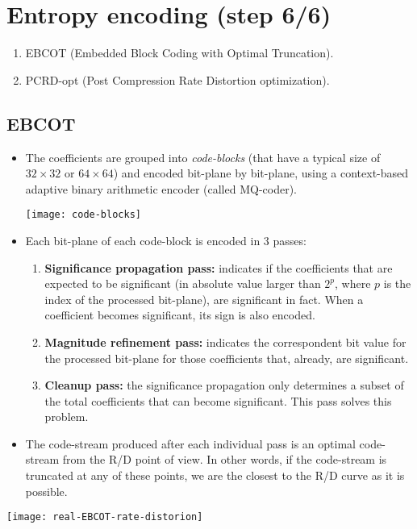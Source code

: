 \section{Entropy encoding (step 6/6)}
\label{J2K-codificacion-entropica}
\begin{enumerate}
\item EBCOT (Embedded Block Coding with Optimal Truncation).
\item PCRD-opt (Post Compression Rate Distortion optimization).
\end{enumerate}

\newpage
\subsection*{EBCOT~\cite{2002.taubman}}
\begin{itemize}
\item The coefficients are grouped into \textit{code-blocks} (that
  have a typical size of $32\times 32$ or $64\times 64$) and encoded
  bit-plane by bit-plane, using a context-based adaptive binary
  arithmetic encoder (called MQ-coder).
  \begin{center}
    \texttt{[image: code-blocks]}
  \end{center}
\newpage
\item Each bit-plane of each code-block is encoded in 3 passes:
\begin{enumerate}
\item \textbf{Significance propagation pass:} indicates if the
  coefficients that are expected to be significant (in absolute value
  larger than $2^p$, where $p$ is the index of the processed
  bit-plane), are significant in fact. When a coefficient becomes
  significant, its sign is also encoded.
\item \textbf{Magnitude refinement pass:} indicates the correspondent
  bit value for the processed bit-plane for those coefficients that,
  already, are significant.
\item \textbf{Cleanup pass:} the significance propagation only
  determines a subset of the total coefficients that can become
  significant. This pass solves this problem.
\end{enumerate}

\newpage
\item The code-stream produced after each individual pass is an
  optimal code-stream from the R/D point of view. In other words, if
  the code-stream is truncated at any of these points, we are the
  closest to the R/D curve as it is possible.
\end{itemize}
\begin{center}
  \texttt{[image: real-EBCOT-rate-distorion]}
\end{center}

